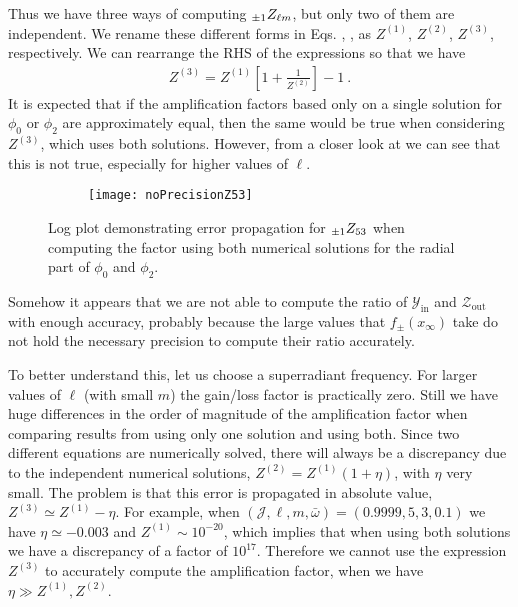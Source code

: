 Thus we have three ways of computing $\uu[\pm 1]{Z}{\ell m}$, but only two of them are independent.
We rename these different forms in Eqs. , ,  as $Z^{(1)}$, $Z^{(2)}$, $Z^{(3)}$, respectively.
We can rearrange the RHS of the expressions so that we have
\begin{align}
	Z^{(3)} = Z^{(1)} \left[ 1 + \frac{1}{Z^{(2)}} \right] - 1 ~.
\end{align}
It is expected that if the amplification factors based only on a single solution for $\phi_0$ or $\phi_2$ are approximately equal, then the same would be true when considering $Z^{(3)}$, which uses both solutions.
However, from a closer look at  we can see that this is not true, especially for higher values of $\ell$.
\begin{figure}[h]
	\centering
	\vspace{0.2cm}
	\begin{subfigure}[c]{0.6\textwidth}
        \texttt{[image: noPrecisionZ53]}
	\end{subfigure}
	\caption{Log plot demonstrating error propagation for $\uu[\pm 1]{Z}{53}$ when computing the factor using both numerical solutions for the radial part of $\phi_0$ and $\phi_2$.}
	\label{fig4:plotZ53}
\end{figure}
Somehow it appears that we are not able to compute the ratio of $\mathscr{Y}_\mathrm{in}$ and $\mathscr{Z}_\mathrm{out}$ with enough accuracy, probably because the large values that $f_{\pm}(x_\infty)$ take do not hold the necessary precision to compute their ratio accurately.

To better understand this, let us choose a superradiant frequency. For larger values of $\ell$ (with small $m$) the gain/loss factor is practically zero.
Still we have huge differences in the order of magnitude of the amplification factor when comparing results from using only one solution and using both.
Since two different equations are numerically solved, there will always be a discrepancy due to the independent numerical solutions, $Z^{(2)} = Z^{(1)} (1+\eta)$, with $\eta$ very small.
The problem is that this error is propagated in absolute value, $Z^{(3)} \simeq Z^{(1)} - \eta$.
For example, when $(\mathscr{J}, \ell, m, \bar{\omega})=(0.9999,5,3,0.1)$ we have $\eta \simeq -0.003$ and $Z^{(1)}\sim 10^{-20}$, which implies that when using both solutions we have a discrepancy of a factor of $10^{17}$.
Therefore we cannot use the expression $Z^{(3)}$ to accurately compute the amplification factor, when we have $\eta \gg Z^{(1)} , Z^{(2)}$.

